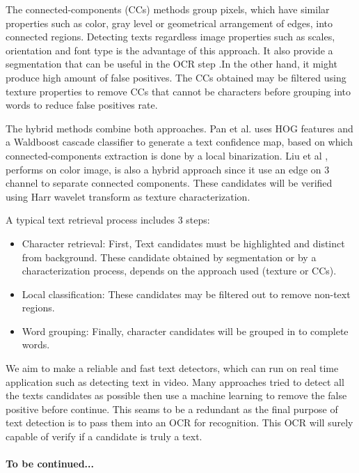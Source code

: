 \par
The connected-components (CCs) methods \cite{Epshtein.2010.CVPR} \cite{xucheng.2013.pami} group pixels, which have similar properties such as color, gray level or geometrical arrangement of edges, into connected regions. Detecting texts regardless image properties such as scales, orientation and font type is the advantage of this approach. It also provide a segmentation that can be useful in the OCR step .In the other hand, it might produce high amount of false positives. The CCs obtained may be filtered using texture properties to remove CCs that cannot be characters before grouping into words to reduce false positives rate.
\par
The hybrid methods combine both approaches. Pan et al. \cite{Pan2009} uses HOG features and a Waldboost cascade classifier to generate a text confidence map, based on which connected-components extraction is done by a local binarization. Liu et al \cite{Liu.2006.CRA}, performs on color image, is also a hybrid approach since it use an edge on 3 channel to separate connected components. These candidates will be verified using Harr wavelet transform as texture characterization.
\par
A typical text retrieval process includes 3 steps:
\begin{itemize}\item
Character retrieval: First, Text candidates must be highlighted and distinct from background. These candidate obtained by segmentation or by a characterization process, depends on the approach used (texture or CCs).
\item
Local classification: These candidates may be filtered out to remove non-text regions.
\item
Word grouping: Finally, character candidates will be grouped in to complete words. 
\end{itemize}
\par 
We aim to make a reliable and fast text detectors, which can run on real time application such as detecting text in video. Many approaches  tried to detect all the texts candidates as possible then use a machine learning to remove the false positive before continue. This seams to be a redundant as the final purpose of text detection is to pass them into an OCR for recognition. This OCR will surely capable of verify if a candidate is truly a text.
\paragraph{To be continued...}
